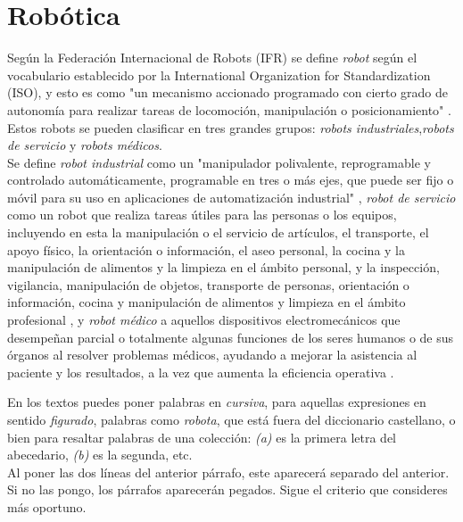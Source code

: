 \section{Robótica}
\label{sec:miseccion} %

Según la Federación Internacional de Robots (IFR) se define \textit{robot} según el vocabulario establecido por la International Organization for Standardization (ISO), y esto es como "un mecanismo accionado programado con cierto grado de autonomía para realizar tareas de locomoción, manipulación o posicionamiento" \cite{ISO8373}.\\  

Estos robots se pueden clasificar en tres grandes grupos: \textit{robots industriales},\textit{robots de servicio} y \textit{robots médicos}.\\

Se define \textit{robot industrial} como un "manipulador polivalente, reprogramable y controlado automáticamente, programable en tres o más ejes, que puede ser fijo o móvil para su uso en aplicaciones de automatización industrial" \cite{ISO8373}, \textit{robot de servicio} como un robot que realiza tareas útiles para las personas o los equipos, incluyendo en esta la manipulación o el servicio de artículos, el transporte, el apoyo físico, la orientación o información, el aseo personal, la cocina y la manipulación de alimentos y la limpieza en el ámbito personal, y la inspección, vigilancia, manipulación de objetos, transporte de personas, orientación o información, cocina y manipulación de alimentos y limpieza en el ámbito profesional \cite{ISO8373}, y \textit{robot médico} a aquellos dispositivos electromecánicos que desempeñan parcial o totalmente algunas funciones de los seres humanos o de sus órganos al resolver problemas médicos, ayudando a mejorar la asistencia al paciente y los resultados, a la vez que aumenta la eficiencia operativa \cite{Kraevsky10}.


En los textos puedes poner palabras en \textit{cursiva}, para aquellas expresiones en sentido \textit{figurado}, palabras como \textit{robota}, que está fuera del diccionario castellano, o bien para resaltar palabras de una colección: \textit{(a)} es la primera letra del abecedario, \textit{(b)} es la segunda, etc.\\

Al poner las dos líneas del anterior párrafo, este aparecerá separado del anterior. Si no las pongo, los párrafos aparecerán pegados. Sigue el criterio que consideres más oportuno.

